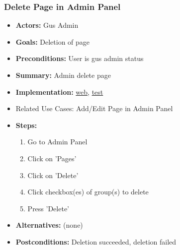 		\subsubsection{Delete Page in Admin Panel}
			\begin{itemize}
				\item{\textbf{Actors:} Gus Admin}
				\item{\textbf{Goals:} Deletion of page}
				\item{\textbf{Preconditions:} User is gus admin status}
				\item{\textbf{Summary:} Admin delete page} 
				\item{\textbf{Implementation:} 	\href{http://nwerp.org/gus/index.php/pages/delete}{web},
								\href{http://nwerp.org/gus/index.php/pages/test}{test}
				}
				\item{Related Use Cases: Add/Edit Page in Admin Panel}
				\item{\textbf{Steps:}}
				\begin{enumerate}
					\item Go to Admin Panel
					\item Click on 'Pages'
					\item Click on 'Delete'
					\item Click checkbox(es) of group(s) to delete
					\item Press 'Delete'
				\end{enumerate}
				\item{\textbf{Alternatives:} (none)}
				\item{\textbf{Postconditions:} Deletion succeeded, deletion failed}
			\end{itemize}

